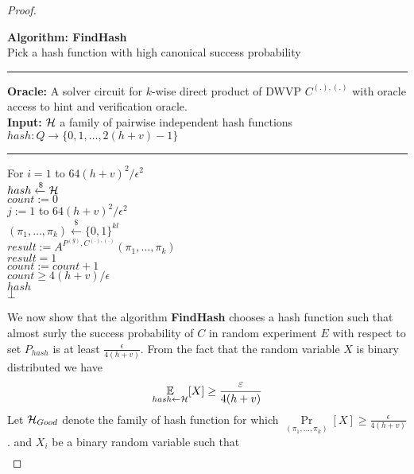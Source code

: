 \begin{proof}
\begin{codeblock}
  \textbf{Algorithm: FindHash} \\
  Pick a hash function with high canonical success probability
  \medskip

  \hrule

  \medskip

  \textbf{Oracle:} A solver circuit for $k$-wise direct product of DWVP $C^{(.),(.)}$ with oracle access to hint and verification oracle.\\
  \textbf{Input:} $\mathcal{H}$ a family of pairwise independent hash functions $hash: Q \rightarrow \{0,1,\dots, 2(h+v)-1\}$  \\
  \medskip\hrule\medskip
  For $i = 1$ to $64(h+v)^2/\epsilon^2$ \\
  \IndI $hash \xleftarrow{\$} \mathcal{H}$ \\
  \IndI $count := 0$ \\
  \IndI \For $j := 1$ to $64(h+v)^2/\epsilon^2$ \\
  \IndII $(\pi_1, \dots, \pi_k) \xleftarrow{\$} \{0,1\}^{kl} $\\
  \IndII $result := A^{P^{(g)},C^{(.), (.)}}(\pi_1, \dots, \pi_k)$\\
  \IndII \If $result = 1$\\
  \IndIII $count := count + 1$\\
  \IndI \If $count \geq 4(h+v)/\epsilon$ \\
  \IndII \return $hash$\\
  \return $\bot$
\end{codeblock}
We now show that the algorithm \textbf{FindHash} chooses a hash function such
that almost surly the success probability of $C$ in random experiment $E$
with respect to set $P_{hash}$ is at least $\frac{\epsilon}{4(h+v)}$.
From the fact that the random variable $X$ is binary distributed we have
\begin{align*}
  \underset{hash \leftarrow \mathcal{H}}{\mathbb{E}}[X] \geq \frac{\varepsilon}{4(h+v)}
\end{align*}
Let $\mathcal{H}_{Good}$ denote the family of hash function for which $\underset{(\pi_1, \dots, \pi_k)}{\Pr}[X] \geq \frac{\epsilon}{4(h+v)}$.
and $X_i$ be a binary random variable such that
\begin{align*}

\end{align*}
\end{proof}
